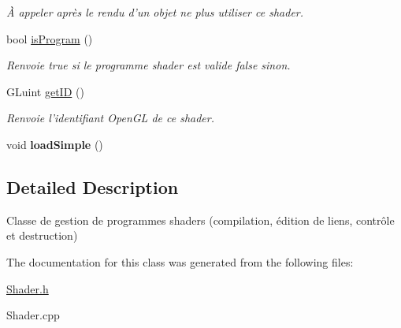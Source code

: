 \begin{DoxyCompactItemize}
\begin{DoxyCompactList}\small\item\em À appeler après le rendu d'un objet ne plus utiliser ce shader. \end{DoxyCompactList}\item 
\hypertarget{classShader_aae9136479d5affe1b14f1c79efe79600}{bool \hyperlink{classShader_aae9136479d5affe1b14f1c79efe79600}{is\-Program} ()}\label{classShader_aae9136479d5affe1b14f1c79efe79600}

\begin{DoxyCompactList}\small\item\em Renvoie true si le programme shader est valide false sinon. \end{DoxyCompactList}\item 
\hypertarget{classShader_ad1bc9a16400499ec80c4f716a390abaf}{G\-Luint \hyperlink{classShader_ad1bc9a16400499ec80c4f716a390abaf}{get\-I\-D} ()}\label{classShader_ad1bc9a16400499ec80c4f716a390abaf}

\begin{DoxyCompactList}\small\item\em Renvoie l'identifiant Open\-G\-L de ce shader. \end{DoxyCompactList}\item 
\hypertarget{classShader_aafa6167c1e130229a19a90bee95aaff0}{void {\bfseries load\-Simple} ()}\label{classShader_aafa6167c1e130229a19a90bee95aaff0}

\end{DoxyCompactItemize}


\subsection{Detailed Description}
Classe de gestion de programmes shaders (compilation, édition de liens, contrôle et destruction) 

The documentation for this class was generated from the following files\-:\begin{DoxyCompactItemize}
\item 
\hyperlink{Shader_8h}{Shader.\-h}\item 
Shader.\-cpp\end{DoxyCompactItemize}
